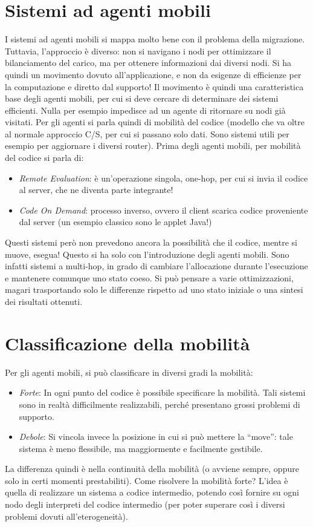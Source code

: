 \section{Sistemi ad agenti mobili}
I sistemi ad agenti mobili si mappa molto bene con il problema della migrazione.
Tuttavia, l'approccio è diverso: non si navigano i nodi per ottimizzare il bilanciamento del carico, ma per ottenere
informazioni dai diversi nodi. Si ha quindi un movimento dovuto all'applicazione, e non da esigenze di efficienze per la
computazione e diretto dal supporto!
Il movimento è quindi una caratteristica base degli agenti mobili, per cui si deve cercare di determinare dei sistemi
efficienti. Nulla per esempio impedisce ad un agente di ritornare su nodi già visitati.
Per gli agenti si parla quindi di mobilità del codice (modello che va oltre al normale approccio C/S, per cui si passano
solo dati. Sono sistemi utili per esempio per aggiornare i diversi router). Prima degli agenti mobili, per mobilità
del codice si parla di:
\begin{itemize}
 \item \textit{Remote Evaluation}: è un'operazione singola, one-hop, per cui si invia il codice al server, che ne
 diventa parte integrante!
 \item \textit{Code On Demand}: processo inverso, ovvero il client scarica codice proveniente dal server (un esempio
 classico sono le applet Java!)
\end{itemize}
Questi sistemi però non prevedono ancora la possibilità che il codice, mentre si muove, esegua! Questo si ha solo con
l'introduzione degli agenti mobili. Sono infatti sistemi a multi-hop, in grado di cambiare l'allocazione durante
l'esecuzione e mantenere comunque uno stato coeso. Si può pensare a varie ottimizzazioni, magari trasportando solo le
differenze rispetto ad uno stato iniziale o una sintesi dei risultati ottenuti.
\section{Classificazione della mobilità}
Per gli agenti mobili, si può classificare in diversi gradi la mobilità:
\begin{itemize}
 \item \textit{Forte}: In ogni punto del codice è possibile specificare la mobilità. Tali sistemi sono in realtà
 difficilmente realizzabili, perché presentano grossi problemi di supporto.
 \item \textit{Debole}: Si vincola invece la posizione in cui si può mettere la ``move'': tale sistema è meno
flessibile, ma maggiormente e facilmente gestibile.
\end{itemize}
La differenza quindi è nella continuità della mobilità (o avviene sempre, oppure solo in certi momenti prestabiliti).
Come risolvere la mobilità forte? L'idea è quella di realizzare un sistema a codice intermedio, potendo così fornire su
ogni nodo degli interpreti del codice intermedio (per poter superare così i diversi problemi dovuti all'eterogeneità).
